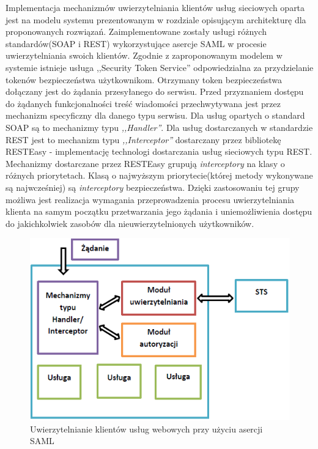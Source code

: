 	Implementacja mechanizmów uwierzytelniania klientów usług sieciowych oparta jest na modelu systemu prezentowanym w rozdziale opisującym architekturę dla proponowanych rozwiązań. Zaimplementowane zostały usługi różnych standardów(SOAP i REST) wykorzystujące asercje SAML w procesie uwierzytelniania swoich klientów. Zgodnie z zaproponowanym modelem w systemie istnieje usługa ,,Security Token Service'' odpowiedzialna za przydzielanie tokenów bezpieczeństwa użytkownikom. Otrzymany token bezpieczeństwa dołączany jest do żądania przesyłanego do serwisu. Przed przyznaniem dostępu do żądanych funkcjonalności treść wiadomości przechwytywana jest przez mechanizm specyficzny dla danego typu serwisu. Dla usług opartych o standard SOAP są to mechanizmy typu \textit{,,Handler''}. Dla usług dostarczanych w standardzie REST jest to mechanizm typu \textit{,,Interceptor''} dostarczany przez bibliotekę RESTEasy - implementację technologi dostarczania usług sieciowych typu REST. Mechanizmy dostarczane przez RESTEasy grupują \textit{interceptory} na klasy o różnych priorytetach. Klasą o najwyższym priorytecie(której metody wykonywane są najwcześniej) są \textit{interceptory} bezpieczeństwa. Dzięki zastosowaniu tej grupy możliwa jest realizacja wymagania przeprowadzenia procesu uwierzytelniania klienta na samym początku przetwarzania jego żądania i uniemożliwienia dostępu do jakichkolwiek zasobów dla nieuwierzytelnionych użytkowników.

	\begin{figure}[h]
		\centering
		\includegraphics{img/interceptorGatewayImplementation.png}
		\caption{Uwierzytelnianie klientów usług webowych przy użyciu asercji SAML}
		\label{interceptorGatewayImplementation}
	\end{figure}


